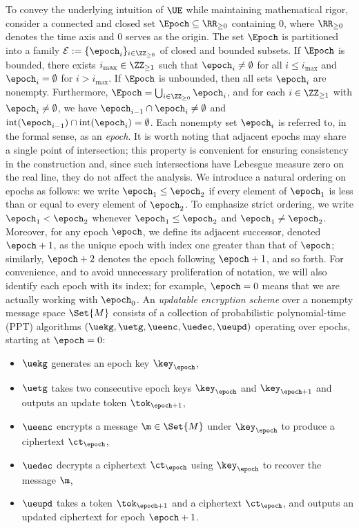\documentclass{fundam}
\begin{document}
To convey the underlying intuition of $\UE$ while maintaining mathematical rigor, consider a connected and closed set $\Epoch \subseteq \RR_{\geq 0}$ containing $0$, where $\RR_{\geq 0}$ denotes the time axis and $0$ serves as the origin. The set $\Epoch$ is partitioned into a family $\mathcal{E} := \{\epoch_i\}_{i \in \ZZ_{\geq 0}}$ of closed and bounded subsets. If $\Epoch$ is bounded, there exists $i_{\max} \in \ZZ_{\geq 1}$ such that $\epoch_i \neq \emptyset$ for all $i \leq i_{\max}$ and $\epoch_i = \emptyset$ for $i > i_{\max}$. If $\Epoch$ is unbounded, then all sets $\epoch_i$ are nonempty. Furthermore, $\Epoch = \bigcup_{i \in \ZZ_{\geq 0}} \epoch_i$, and for each $i \in \ZZ_{\geq 1}$ with $\epoch_i \neq \emptyset$, we have $\epoch_{i-1} \cap \epoch_i \neq \emptyset$ and $\operatorname{int}(\epoch_{i-1}) \cap \operatorname{int}(\epoch_i) = \emptyset$. Each nonempty set $\epoch_i$ is referred to, in the formal sense, as an \emph{epoch}. It is worth noting that adjacent epochs may share a single point of intersection; this property is convenient for ensuring consistency in the construction and, since such intersections have Lebesgue measure zero on the real line, they do not affect the analysis. We introduce a natural ordering on epochs as follows: we write $\epoch_1 \leq \epoch_2$ if every element of $\epoch_1$ is less than or equal to every element of $\epoch_2$. To emphasize strict ordering, we write $\epoch_1 < \epoch_2$ whenever $\epoch_1 \leq \epoch_2$ and $\epoch_1 \neq \epoch_2$. Moreover, for any epoch $\epoch$, we define its adjacent successor, denoted $\epoch+1$, as the unique epoch with index one greater than that of $\epoch$; similarly, $\epoch+2$ denotes the epoch following $\epoch+1$, and so forth. For convenience, and to avoid unnecessary proliferation of notation, we will also identify each epoch with its index; for example, $\epoch=0$ means that we are actually working with $\epoch_0$. An \textit{updatable encryption scheme} over a nonempty message space $\Set{M}$ consists of a collection of probabilistic polynomial-time (PPT) algorithms $(\uekg, \uetg, \ueenc, \uedec, \ueupd)$ operating over epochs, starting at $\epoch = 0$:
\begin{itemize}
	\item $\uekg$ generates an epoch key $\key_{\epoch}$,
	\item $\uetg$ takes two consecutive epoch keys $\key_{\epoch}$ and $\key_{\epoch+1}$ and outputs an update token $\tok_{\epoch+1}$,
	\item $\ueenc$ encrypts a message $\m \in \Set{M}$ under $\key_{\epoch}$ to produce a ciphertext $\ct_{\epoch}$,
	\item $\uedec$ decrypts a ciphertext $\ct_{\epoch}$ using $\key_{\epoch}$ to recover the message $\m$,
	\item $\ueupd$ takes a token $\tok_{\epoch+1}$ and a ciphertext $\ct_{\epoch}$, and outputs an updated ciphertext for epoch $\epoch+1$.
\end{itemize}
\end{document}
